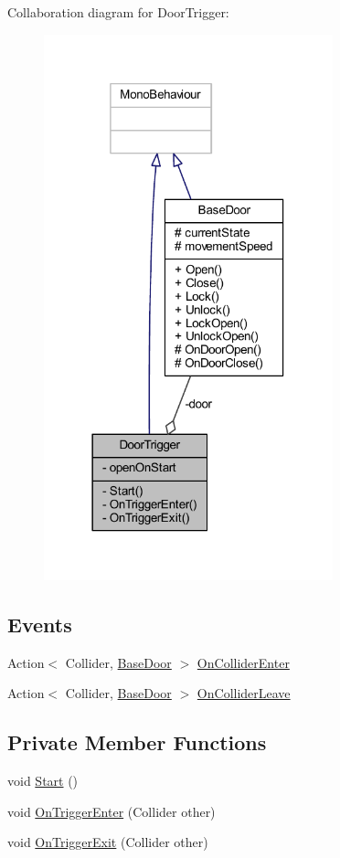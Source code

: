 Collaboration diagram for Door\+Trigger\+:
\nopagebreak
\begin{figure}[H]
\begin{center}
\leavevmode
\includegraphics[width=237pt]{class_door_trigger__coll__graph}
\end{center}
\end{figure}
\subsection*{Events}
\begin{DoxyCompactItemize}
\item 
Action$<$ Collider, \mbox{\hyperlink{class_base_door}{Base\+Door}} $>$ \mbox{\hyperlink{class_door_trigger_aaf26dd7fb0f0ce643f5fd50805e2b4e0}{On\+Collider\+Enter}}
\item 
Action$<$ Collider, \mbox{\hyperlink{class_base_door}{Base\+Door}} $>$ \mbox{\hyperlink{class_door_trigger_af00f29ad47c5853b9f8ff03048223e30}{On\+Collider\+Leave}}
\end{DoxyCompactItemize}
\subsection*{Private Member Functions}
\begin{DoxyCompactItemize}
\item 
void \mbox{\hyperlink{class_door_trigger_a3b079888a26feb3139b6a0507b89c65c}{Start}} ()
\item 
void \mbox{\hyperlink{class_door_trigger_a9cad842a8527ec462aae682c8c50b118}{On\+Trigger\+Enter}} (Collider other)
\item 
void \mbox{\hyperlink{class_door_trigger_adee54426b691466c5d667b912816bb56}{On\+Trigger\+Exit}} (Collider other)
\end{DoxyCompactItemize}
